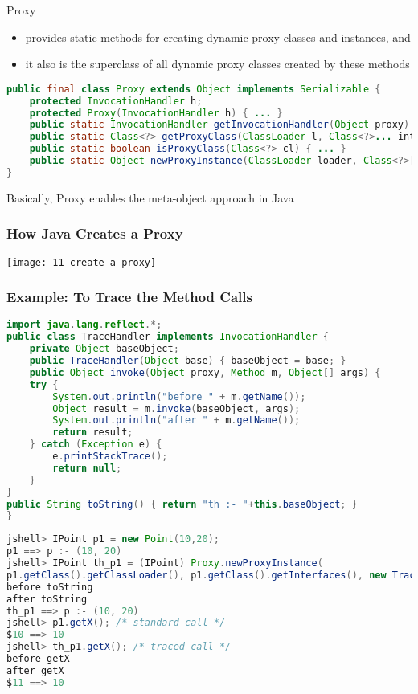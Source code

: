 Proxy

\begin{itemize}
	\item  provides static methods for creating dynamic proxy classes and instances, and
	\item  it also is the superclass of all dynamic proxy classes created by these methods
\end{itemize}

\begin{lstlisting}[language=Java]
public final class Proxy extends Object implements Serializable {
	protected InvocationHandler h;
	protected Proxy(InvocationHandler h) { ... }
	public static InvocationHandler getInvocationHandler(Object proxy) { ... }
	public static Class<?> getProxyClass(ClassLoader l, Class<?>... interfaces) { ... }
	public static boolean isProxyClass(Class<?> cl) { ... }
	public static Object newProxyInstance(ClassLoader loader, Class<?>[] interfaces, InvocationHandler h ) { ... }
}
\end{lstlisting}

Basically, Proxy enables the meta-object approach in Java

\subsubsection{How Java Creates a Proxy}

\begin{center}
\texttt{[image: 11-create-a-proxy]}
\end{center}

\subsubsection{Example: To Trace the Method Calls}

\begin{lstlisting}[language=Java]
import java.lang.reflect.*;
public class TraceHandler implements InvocationHandler {
	private Object baseObject;
	public TraceHandler(Object base) { baseObject = base; }
	public Object invoke(Object proxy, Method m, Object[] args) {
	try {
		System.out.println("before " + m.getName());
		Object result = m.invoke(baseObject, args);
		System.out.println("after " + m.getName());
		return result;
	} catch (Exception e) {
		e.printStackTrace(); 
		return null;
	}
}
public String toString() { return "th :- "+this.baseObject; }
}
\end{lstlisting}

\begin{lstlisting}[language=Java]
jshell> IPoint p1 = new Point(10,20);
p1 ==> p :- (10, 20)
jshell> IPoint th_p1 = (IPoint) Proxy.newProxyInstance(
p1.getClass().getClassLoader(), p1.getClass().getInterfaces(), new TraceHandler(p1));
before toString
after toString
th_p1 ==> p :- (10, 20)
jshell> p1.getX(); /* standard call */
$10 ==> 10
jshell> th_p1.getX(); /* traced call */
before getX
after getX
$11 ==> 10
\end{lstlisting}


